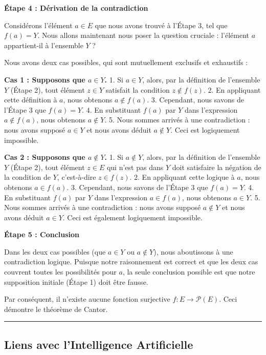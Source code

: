 \documentclass[12pt,a4paper]{report}
\begin{document}
\textbf{Étape 4 : Dérivation de la contradiction}

Considérons l'élément \(a \in E\) que nous avons trouvé à l'Étape 3, tel
que \(f(a) = Y\). Nous allons maintenant nous poser la question cruciale
: l'élément \(a\) appartient-il à l'ensemble \(Y\) ?

Nous avons deux cas possibles, qui sont mutuellement exclusifs et
exhaustifs :

\textbf{Cas 1 : Supposons que \(a \in Y\).} 1. Si \(a \in Y\), alors,
par la définition de l'ensemble \(Y\) (Étape 2), tout élément
\(z \in Y\) satisfait la condition \(z \notin f(z)\). 2. En appliquant
cette définition à \(a\), nous obtenons \(a \notin f(a)\). 3. Cependant,
nous savons de l'Étape 3 que \(f(a) = Y\). 4. En substituant \(f(a)\)
par \(Y\) dans l'expression \(a \notin f(a)\), nous obtenons
\(a \notin Y\). 5. Nous sommes arrivés à une contradiction : nous avons
supposé \(a \in Y\) et nous avons déduit \(a \notin Y\). Ceci est
logiquement impossible.

\textbf{Cas 2 : Supposons que \(a \notin Y\).} 1. Si \(a \notin Y\),
alors, par la définition de l'ensemble \(Y\) (Étape 2), tout élément
\(z \in E\) qui n'est pas dans \(Y\) doit satisfaire la négation de la
condition de \(Y\), c'est-à-dire \(z \in f(z)\). 2. En appliquant cette
logique à \(a\), nous obtenons \(a \in f(a)\). 3. Cependant, nous savons
de l'Étape 3 que \(f(a) = Y\). 4. En substituant \(f(a)\) par \(Y\) dans
l'expression \(a \in f(a)\), nous obtenons \(a \in Y\). 5. Nous sommes
arrivés à une contradiction : nous avons supposé \(a \notin Y\) et nous
avons déduit \(a \in Y\). Ceci est également logiquement impossible.

\textbf{Étape 5 : Conclusion}

Dans les deux cas possibles (que \(a \in Y\) ou \(a \notin Y\)), nous
aboutissons à une contradiction logique. Puisque notre raisonnement est
correct et que les deux cas couvrent toutes les possibilités pour \(a\),
la seule conclusion possible est que notre supposition initiale (Étape
1) doit être fausse.

Par conséquent, il n'existe aucune fonction surjective
\(f: E \to \mathcal{P}(E)\). Ceci démontre le théorème de Cantor.

\begin{center}\rule{0.5\linewidth}{0.5pt}\end{center}

\subsection{Liens avec l'Intelligence
Artificielle}\label{liens-avec-lintelligence-artificielle}
\end{document}
